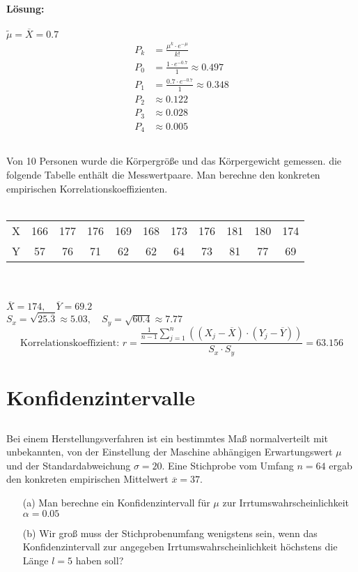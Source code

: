 \documentclass[ngerman]{scrartcl}
\begin{document}
\paragraph{Lösung:}
$\tilde{\mu} = \overline{X} = 0.7$
\begin{align*}
P_k &= \frac{\mu^{k}\cdot e^{-\mu}}{k!}\\
P_0 &= \frac{1\cdot e^{-0.7}}{1}\approx 0.497\\
P_1 &= \frac{0.7\cdot e^{-0.7}}{1}\approx 0.348\\
P_2 &\approx 0.122\\
P_3 &\approx 0.028\\
P_4 &\approx 0.005
\end{align*}

\subsection{}
Von 10 Personen wurde die Körpergröße und das Körpergewicht gemessen. die folgende Tabelle enthält die Messwertpaare. Man berechne den konkreten empirischen Korrelationskoeffizienten.\\
\\
\begin{tabular}{c c c c c c c c c c c }
\hline
X& 166& 177& 176& 169& 168& 173& 176&181& 180& 174\\
Y& 57& 76& 71& 62& 62& 64& 73& 81& 77& 69\\\hline
\end{tabular} \\\\

$\overline{X} = 174,\quad \overline{Y} = 69.2$\\
$S_x = \sqrt{25.\overline{3}}\approx 5.03,\quad S_y = \sqrt{60.4}\approx 7.77$
\begin{equation*}
\text{Korrelationskoeffizient: }r = \frac{\frac{1}{n-1} \sum_{j=1}^{n}\left((X_j - \overline{X})\cdot (Y_j - \overline{Y})\right)}{S_x \cdot S_y} = 63.156
\end{equation*}
\section{Konfidenzintervalle}
\subsection{}
Bei einem Herstellungsverfahren ist ein bestimmtes Maß normalverteilt mit unbekannten, von der Einstellung der Maschine abhängigen Erwartungswert $\mu$ und der Standardabweichung $\sigma = 20$. Eine Stichprobe vom Umfang $n=64$ ergab den konkreten empirischen Mittelwert $\overline{x} = 37$.
\begin{enumerate}
\item[(a)] Man berechne ein Konfidenzintervall für $\mu$ zur Irrtumswahrscheinlichkeit $\alpha = 0.05$
\item[(b)] Wir groß muss der Stichprobenumfang wenigstens sein, wenn das Konfidenzintervall zur angegeben Irrtumswahrscheinlichkeit höchstens die Länge $l=5$ haben soll?
\end{enumerate}
\end{document}
